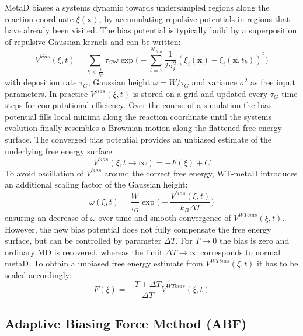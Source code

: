 MetaD biases a systems dynamic towards undersampled regions along the reaction coordinate $\xi(\textbf{x})$, by accumulating repulsive potentials in regions that have already been visited. The bias potential is typically build by a superposition of repulsive Gaussian kernels and can be written:\autocite{barducci2011metadynamics}
\begin{equation}
  V^{bias}(\xi,t)= \sum_{k<\frac{t}{\tau_G}} \tau_G \omega \exp\biggr(-\sum_{i=1}^{N_{dim}} \frac{1}{2\sigma_{i}^{2}} (\xi_{i}(\textbf{x})-\xi_{i}(\textbf{x},t_k))^2 \biggl)
\end{equation}
with deposition rate $\tau_G$, Gaussian height $\omega=W/\tau_G$ and variance $\sigma^2$ as free input parameters. In practice $V^{bias}(\xi,t)$ is stored on a grid and updated every $\tau_G$ time steps for computational efficiency. Over the course of a simulation the bias potential fills local minima along the reaction coordinate until the systems evolution finally resembles a Brownian motion along the flattened free energy surface. The converged bias potential provides an unbiased estimate of the underlying free energy surface
\begin{equation}
  V^{bias}(\xi, t \to \infty) = - F(\xi) + C
\end{equation}
To avoid oscillation of $V^{bias}$ around the correct free energy, WT-metaD introduces an additional scaling factor of the Gaussian height:\autocite{barducci2008well}
\begin{equation}
  \omega(\xi,t) = \frac{W}{\tau_G}\exp\biggl(-\frac{V^{bias}(\xi,t)}{k_B \Delta T} \biggr)
\end{equation}
ensuring an decrease of $\omega$ over time and smooth convergence of $V^{WTbias}(\xi,t)$. However, the new bias potential does not fully compensate the free energy surface, but can be controlled by parameter $\Delta T$. For $T \to 0$ the bias is zero and ordinary MD is recovered, whereas the limit $\Delta T \to \infty$ corresponds to normal metaD. To obtain a unbiased free energy estimate from $V^{WTbias}(\xi,t)$ it has to be scaled accordingly:
\begin{equation}
F(\xi) = -\frac{T+\Delta T}{\Delta T}V^{WTbias}(\xi, t)
\end{equation}

\subsection{Adaptive Biasing Force Method (ABF)}
\label{sec:ABF}

